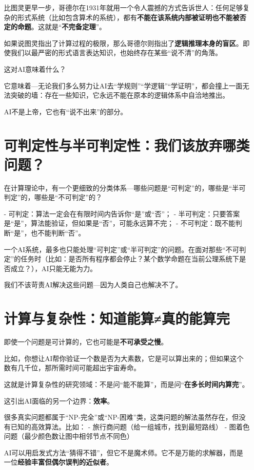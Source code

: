 比图灵更早一步，哥德尔在1931年就用一个令人震撼的方式告诉世人：任何足够复杂的形式系统（比如包含算术的系统），都有\textbf{不能在该系统内部被证明也不能被否定的命题}。这就是“\textbf{不完备定理}”。

如果说图灵指出了计算过程的极限，那么哥德尔则指出了\textbf{逻辑推理本身的盲区}。即使我们以最严密的形式语言表达知识，也始终存在某些“说不清”的角落。

这对AI意味着什么？

它意味着---无论我们多么努力让AI去“学规则”“学逻辑”“学证明”，都会撞上一面无法突破的墙：存在一些知识，它永远不能在原本的逻辑体系中自洽地推出。

AI不是上帝，它也有“说不出来”的部分。

\section*{可判定性与半可判定性：我们该放弃哪类问题？}

在计算理论中，有一个更细致的分类体系---哪些问题是“可判定”的，哪些是“半可判定”的，哪些是“不可判定”的？

- 可判定：算法一定会在有限时间内告诉你“是”或“否”；
- 半可判定：只要答案是“是”，算法能验证，但如果是“否”，可能永远算不完；
- 不可判定：既不能判断“是”，也不能判断“否”。

一个AI系统，最多也只能处理“可判定”或“半可判定”的问题。在面对那些“不可判定”的任务时（比如：是否所有程序都会停止？某个数学命题在当前公理系统下是否成立？），AI只能无能为力。

我们不该苛责AI解决这些问题---因为人类自己也解决不了。

\section*{计算与复杂性：知道能算≠真的能算完}

即使一个问题是可计算的，它也可能是\textbf{不可承受之慢}。

比如，你想让AI帮你验证一个数是否为大素数，它是可以算出来的；但如果这个数有几千位，那所需时间可能超出宇宙寿命。

这就是计算复杂性的研究领域：不是问“能不能算”，而是问“\textbf{在多长时间内算完}”。

这引出AI面临的另一个边界：\textbf{效率}。

很多真实问题都属于“NP-完全”或“NP-困难”类，这类问题的解法虽然存在，但没有已知的高效算法。比如：
- 旅行商问题（给一组城市，找到最短路线）
- 图着色问题（最少颜色数让图中相邻节点不同色）

AI可以用启发式方法“猜得不错”，但它不是魔术师。它不是万能的求解器，而是一位\textbf{经验丰富但偶尔误判的近似者}。

